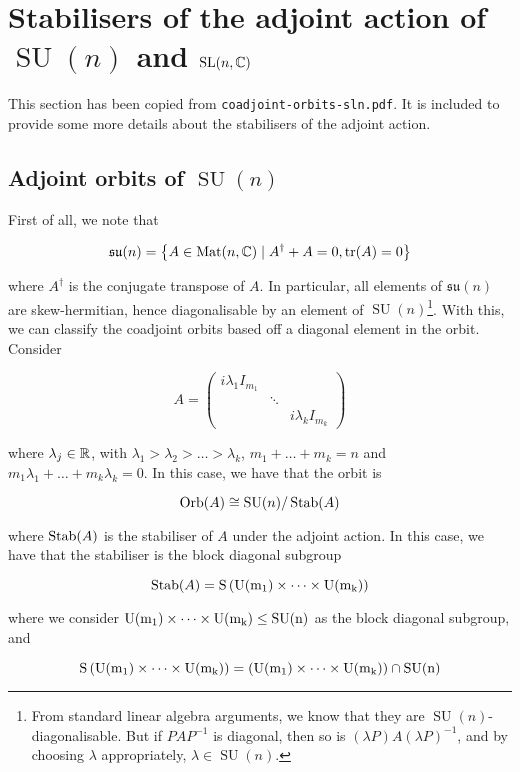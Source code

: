 \documentclass{article}
\DeclareMathOperator{\SU}{SU}
\newcommand{\su}{\mathfrak{su}}
\begin{document}
\section{Stabilisers of the adjoint action of \(\SU(n)\) and \(\operatorname{SL}(n, \mathbb{C})\)}

This section has been copied from \texttt{coadjoint-orbits-sln.pdf}. It is included to provide some more details about the stabilisers of the adjoint action.

\subsection{Adjoint orbits of \(\SU(n)\)}

First of all, we note that

\[\su(n) = \left\{A \in \Mat(n, \C) \mid A^\dagger + A = 0, \tr(A) = 0\right\}\]

where \(A^\dagger\) is the conjugate transpose of \(A\). In particular, all elements of \(\su(n)\) are skew-hermitian, hence diagonalisable by an element of \(\SU(n)\)\footnote{From standard linear algebra arguments, we know that they are \(\SU(n)\)-diagonalisable. But if \(PAP^{-1}\) is diagonal, then so is \((\lambda P)A(\lambda P)^{-1}\), and by choosing \(\lambda\) appropriately, \(\lambda \in \SU(n)\).}. With this, we can classify the coadjoint orbits based off a diagonal element in the orbit. Consider

\[A = \begin{pmatrix}
    i\lambda_1 I_{m_1} \\
    & \ddots \\
    & & i\lambda_k I_{m_k}
\end{pmatrix}\]

where \(\lambda_j \in \mathbb{R}\), with \(\lambda_1 > \lambda_2 > \dots > \lambda_k\), \(m_1 + \dots + m_k = n\) and \(m_1\lambda_1 + \dots + m_k\lambda_k = 0\). In this case, we have that the orbit is

\[\Orb(A) \cong \SU(n)/\Stab(A)\]

where \(\operatorname{Stab}(A)\) is the stabiliser of \(A\) under the adjoint action. In this case, we have that the stabiliser is the block diagonal subgroup

\[\operatorname{Stab}(A) = \rm S\left(\rm U(m_1) \times \dots \times \rm U(m_k)\right)\]

where we consider \(\rm U(m_1) \times \cdots \times \rm U(m_k) \le \SU(n)\) as the block diagonal subgroup, and

\[\rm S\left(\rm U(m_1) \times \dots \times \rm U(m_k)\right) = \left(\rm U(m_1) \times \cdots \times \rm U(m_k)\right) \cap \SU(n)\]
\end{document}
